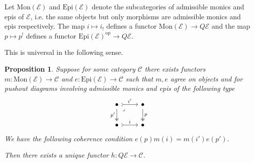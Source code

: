 \documentclass[12pt]{report}
\numberwithin{equation}{section}
\newtheorem{proposition}[dummy]{Proposition}
\begin{document}
	Let \( \mathrm{Mon}(\mathcal{E}) \) and \( \mathrm{Epi}(\mathcal{E}) \) denote the subcategories of admissible monics and epis	of \( \mathcal{E}  \), i.e. the same objects but only morphisms are admissible monics and epis respectively. The map \( i \mapsto i_! \) defines a functor \( \mathrm{Mon}(\mathcal{E}) \to Q \mathcal{E} \) and the map \( p \mapsto p^! \) defines a functor \( \mathrm{Epi}(\mathcal{E})^\mathrm{op} \to Q \mathcal{E}\).
	
	This is universal in the following sense.
	\begin{proposition}\label{prop:universalpropertyofQconst}
		Suppose for some category \( \mathcal{C} \) there exists functors \( m: \mathrm{Mon} (\mathcal{E}) \to \mathcal{C}\) and \( e : \mathrm{Epi}(\mathcal{E} ) \to \mathcal{C} \) such that \( m,e \) agree on objects and for pushout diagrams involving admissible monics and epis of the following type
	\[\begin{tikzcd}
		\bullet & \bullet \\
		\bullet & \bullet
		\arrow["{i'}", tail, from=1-1, to=1-2]
		\arrow["{p'}"', two heads, from=1-1, to=2-1]
		\arrow["\lrcorner"{anchor=center, pos=0.125}, draw=none, from=1-1, to=2-2]
		\arrow["p", two heads, from=1-2, to=2-2]
		\arrow["i", tail, from=2-1, to=2-2]
	\end{tikzcd}\]
		We have the following coherence condition \( e(p)m(i)=m(i')e(p') \).
		
		Then there exists a unique functor \( h:Q\mathcal{E} \to \mathcal{C} \).
	\end{proposition}
\end{document}
